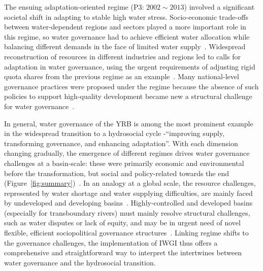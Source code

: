 \documentclass[draft]{../agujournal2019}
\begin{document}
The ensuing adaptation-oriented regime (P3: $2002 \sim 2013$) involved a significant societal shift in adapting to stable high water stress.
Socio-economic trade-offs between water-dependent regions and sectors played a more important role in this regime, so water governance had to achieve efficient water allocation while balancing different demands in the face of limited water supply~\cite{dalin2015,song2022}.
Widespread reconstruction of resources in different industries and regions led to calls for adaptation in water governance, using the urgent requirements of adjusting rigid quota shares from the previous regime as an example~\cite{wang2019e}.
Many national-level governance practices were proposed under the regime because the absence of such policies to support high-quality development became new a structural challenge for water governance~\cite{konar2019}.

In general, water governance of the YRB is among the most prominent example in the widespread transition to a hydrosocial cycle -``improving supply, transforming governance, and enhancing adaptation''.
With each dimension changing gradually, the emergence of different regimes drives water governance challenges at a basin-scale: these were primarily economic and environmental before the transformation, but social and policy-related towards the end (Figure~\ref{fig:summary})~\cite{singh2019,porcher2019}.
In an analogy at a global scale, the resource challenges, represented by water shortage and water supplying difficulties, are mainly faced by undeveloped and developing basins~\cite{allan2019,speed2013,liu2012a}.
Highly-controlled and developed basins (especially for transboundary rivers) must mainly resolve structural challenges, such as water disputes or lack of equity, and may be in urgent need of novel flexible, efficient sociopolitical governance structures~\cite{unep-dhi2016,mirumachi2015}.
Linking regime shifts to the governance challenges, the implementation of IWGI thus offers a comprehensive and straightforward way to interpret the intertwines between water governance and the hydrosocial transition.
\end{document}
